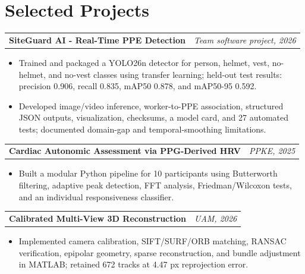 \documentclass[10pt,a4paper]{article}
\makeatletter
\newcommand{\project}[2]{%
  \begin{tabularx}{\textwidth}{@{}X r@{}}
    \textbf{#1} & \textit{#2}
  \end{tabularx}\vspace{-2pt}
}
\makeatother
\begin{document}
\newpage

\section{Selected Projects}
\project{SiteGuard AI - Real-Time PPE Detection}{Team software project, 2026}
\begin{itemize}
  \item Trained and packaged a YOLO26n detector for person, helmet, vest, no-helmet, and no-vest classes using transfer learning; held-out test results: precision 0.906, recall 0.835, mAP50 0.878, and mAP50-95 0.592.
  \item Developed image/video inference, worker-to-PPE association, structured JSON outputs, visualization, checksums, a model card, and 27 automated tests; documented domain-gap and temporal-smoothing limitations.
\end{itemize}

\project{Cardiac Autonomic Assessment via PPG-Derived HRV}{PPKE, 2025}
\begin{itemize}
  \item Built a modular Python pipeline for 10 participants using Butterworth filtering, adaptive peak detection, FFT analysis, Friedman/Wilcoxon tests, and an individual responsiveness classifier.
\end{itemize}

\project{Calibrated Multi-View 3D Reconstruction}{UAM, 2026}
\begin{itemize}
  \item Implemented camera calibration, SIFT/SURF/ORB matching, RANSAC verification, epipolar geometry, sparse reconstruction, and bundle adjustment in MATLAB; retained 672 tracks at 4.47 px reprojection error.
\end{itemize}
\end{document}
